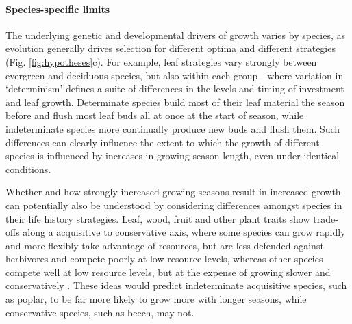 \documentclass[11pt]{article}
\begin{document}
\paragraph{Species-specific limits}
The underlying genetic and developmental drivers of growth varies by species, as evolution generally drives selection for different optima and different strategies (Fig. \ref{fig:hypotheses}c). For example, leaf strategies vary strongly between evergreen and deciduous species, but also within each group---where variation in `determinism' defines a suite of differences in the levels and timing of investment and leaf growth. Determinate species build most of their leaf material the season before and flush most leaf buds all at once at the start of season, while indeterminate species more continually produce new buds and flush them. Such differences can clearly influence the extent to which the growth of different species is influenced by increases in growing season length, even under identical conditions.%

Whether and how strongly increased growing seasons result in increased growth can potentially also be understood by considering differences amongst species in their life history strategies. Leaf, wood, fruit and other plant traits show trade-offs along a acquisitive to conservative axis, where some species can grow rapidly and more flexibly take advantage of resources, but are less defended against herbivores and compete poorly at low resource levels, whereas other species compete well at low resource levels, but at the expense of growing slower and conservatively \citep[][]{Grime:1977sw,diaz2016}. These ideas would predict indeterminate acquisitive species, such as poplar, to be far more likely to grow more with longer seasons, while conservative species, such as beech, may not.  
\end{document}
